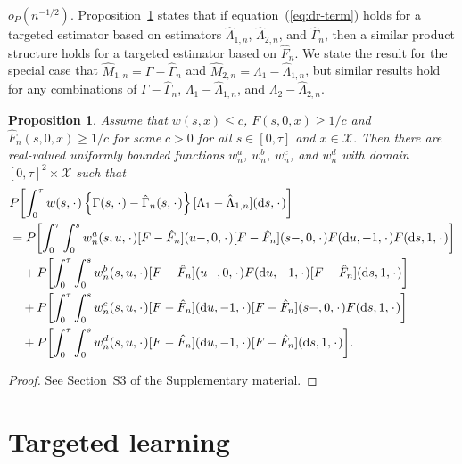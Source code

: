 \documentclass[11pt]{article}
\theoremstyle{thmstyleone}%
\newtheorem{proposition}{Proposition}
\theoremstyle{thmstyletwo}%
\theoremstyle{thmstylethree}%
\newcommand{\blank}{\makebox[1ex]{\textbf{$\cdot$}}}
\newcommand*\diff{\mathop{}\!\mathrm{d}}
\newcommand\smallO{\textit{o}}
\newcommand{\1}{\mathds{1}}
\begin{document}
\( \smallO_P{(n^{-1/2})}\). Proposition~\ref{prop:dr-structure} states that if
equation~(\ref{eq:dr-term}) holds for a targeted estimator based on estimators
$\hat{\Lambda}_{1,n}$, $\hat{\Lambda}_{2,n}$, and $\hat{\Gamma}_{n}$, then a
similar product structure holds for a targeted estimator based on
\( \hat{F}_n \). We state the result for the special case that
\(\hat{M}_{1,n}= \Gamma-\hat{\Gamma}_n \) and
\(\hat{M}_{2,n} =\Lambda_1-\hat{\Lambda}_{1,n} \), but similar results hold for
any combinations of \( \Gamma-\hat{\Gamma}_n\),
\( \Lambda_1-\hat{\Lambda}_{1,n} \), and \( \Lambda_2-\hat{\Lambda}_{2,n} \).
\begin{proposition}
  \label{prop:dr-structure}
  Assume that \( w(s,x)\leq c \), \( F(s, 0, x) \geq 1/c \) and
  \( \hat{F}_n(s, 0, x) \geq 1/c \) for some \( c>0 \) for all
  \( s \in [0, \tau] \) and \( x \in \mathcal{X} \). Then there are real-valued
  uniformly bounded functions \( w^a_n \), \( w^b_n \), \( w^c_n \), and
  \( w^d_n \) with domain \( [0,\tau]^2 \times \mathcal{X} \) such that
  \begin{align*}
    & P{\left[
      \int_0^{\tau} w(s, \blank)
      \left\{
      \Gamma(s,\blank) -\hat{\Gamma}_n(s,\blank)
      \right\}
      [\Lambda_1-\hat{\Lambda}_{1,n}]
      (\diff s, \blank)
      \right]}
    \\
     & =
      P{\left[
      \int_0^{\tau} \int_0^{s} w^a_n(s,u,\blank) [F - \hat{F}_n](u-, 0, \blank)[F - \hat{F}_n](s-, 0, \blank) F(\diff u, -1, \blank ) F ( \diff s, 1, \blank)
      \right]}
    \\
    & \quad +
      P{\left[
      \int_0^{\tau} \int_0^{s} w^b_n(s,u,\blank) [F - \hat{F}_n](u-, 0, \blank)
      F(\diff u, -1, \blank ) [F - \hat{F}_n](\diff s, 1, \blank)
      \right]}
    \\
    & \quad +
      P{\left[
      \int_0^{\tau} \int_0^{s} w^c_n(s,u,\blank) [F - \hat{F}_n](\diff u, -1, \blank)
      [F - \hat{F}_n](s-, 0, \blank)
      F(\diff s, 1, \blank ) 
      \right]}
    \\
    & \quad +
      P{\left[
      \int_0^{\tau} \int_0^{s} w^d_n(s,u,\blank) [F - \hat{F}_n](\diff u, -1, \blank)
      [F - \hat{F}_n](\diff s, 1, \blank)
      \right]}.
  \end{align*}
\end{proposition}
\begin{proof}
  See Section~S3 of the Supplementary material.
\end{proof}

\section{Targeted learning}
\label{sec:targeted-learning}
\end{document}
